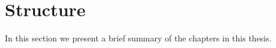 






\section{Structure}

In this section we present a brief summary of the chapters in this thesis.

